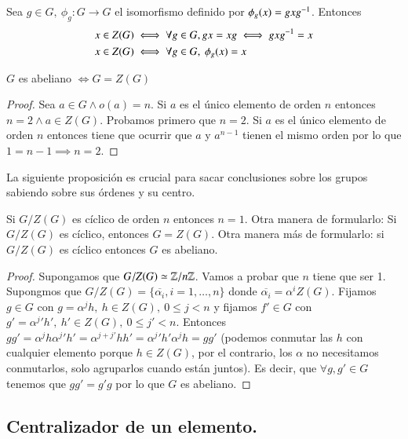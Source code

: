 \begin{pro}
	Sea $g \in G,\ \phi_g: G \to G$ el isomorfismo definido por $\phi_g(x) = gxg^{-1}$. Entonces
	\begin{align*}
	x \in Z(G) &\iff \forall g \in G, gx = xg \iff gxg^{-1} = x \\
	x \in Z(G) &\iff \forall g \in G,\ \phi_g(x) = x 
	\end{align*}
\end{pro}

\begin{pro}
	\label{pro:centroigualabeliano}
	$G$ es abeliano $\iff G = Z(G)$
\end{pro}

\begin{proof}
	Sea $a \in G \land o(a) = n$. Si $a$ es el único elemento de orden $n$ entonces $n = 2 \land a \in Z(G)$. Probamos primero que $n=2$. Si $a$ es el único elemento de orden $n$ entonces tiene que ocurrir que $a$ y $a^{n-1}$ tienen el mismo orden por lo que $1 = n-1 \implies n = 2$.
\end{proof}

La siguiente proposición es crucial para sacar conclusiones sobre los grupos sabiendo sobre sus órdenes y su centro.

\begin{pro}
	\label{pro:triplecentro}
	Si $G/Z(G)$ es cíclico de orden $n$ entonces $n = 1$. Otra manera de formularlo: Si $G/Z(G)$ es cíclico, entonces $G = Z(G)$. Otra manera más de formularlo: si $G/Z(G)$ es cíclico entonces $G$ es abeliano.
\end{pro}

\begin{proof}
	Supongamos que $G/Z(G) \simeq \mathbb{Z}/n\mathbb{Z}$. Vamos a probar que $n$ tiene que ser 1. Supongmos que $G/Z(G) = \{\overline{\alpha_i}, i = 1, \dots, n\}$ donde $\overline{\alpha_i} = \alpha^i Z(G)$. Fijamos $g \in G$ con $g = \alpha^j h,\ h \in Z(G),\ 0 \leq j < n$ y fijamos $f' \in G$ con $g' = {\alpha^j}' h',\ h' \in Z(G),\ 0 \leq j' < n$. Entonces $gg' = \alpha^j h{\alpha^j}' h' = \alpha^{j+j'}hh' = {\alpha^j}' h' \alpha^j h = gg'$ (podemos conmutar las $h$ con cualquier elemento porque $h \in Z(G)$, por el contrario, los $\alpha$ no necesitamos conmutarlos, solo agruparlos cuando están juntos). Es decir, que $\forall g, g' \in G$ tenemos que $gg' = g'g$ por lo que $G$ es abeliano.
\end{proof}

\subsection{Centralizador de un elemento.}


